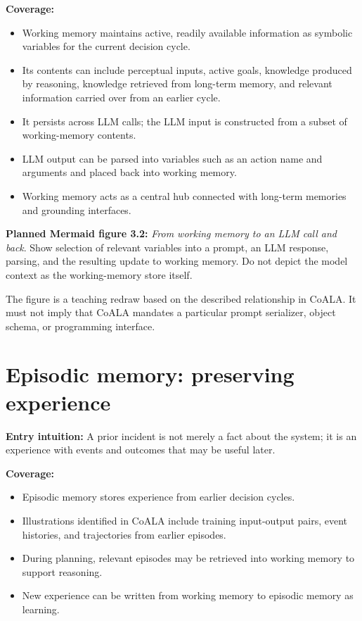 \textbf{Coverage:}
\begin{itemize}
  \item Working memory maintains active, readily available information as symbolic variables for the current decision cycle.
  \item Its contents can include perceptual inputs, active goals, knowledge produced by reasoning, knowledge retrieved from long-term memory, and relevant information carried over from an earlier cycle.
  \item It persists across LLM calls; the LLM input is constructed from a subset of working-memory contents.
  \item LLM output can be parsed into variables such as an action name and arguments and placed back into working memory.
  \item Working memory acts as a central hub connected with long-term memories and grounding interfaces.
\end{itemize}

\textbf{Planned Mermaid figure 3.2:} \emph{From working memory to an LLM call and back}. Show selection of relevant variables into a prompt, an LLM response, parsing, and the resulting update to working memory. Do not depict the model context as the working-memory store itself.

\begin{notebox}
The figure is a teaching redraw based on the described relationship in CoALA. It must not imply that CoALA mandates a particular prompt serializer, object schema, or programming interface.
\end{notebox}

\section{Episodic memory: preserving experience}
\textbf{Entry intuition:} A prior incident is not merely a fact about the system; it is an experience with events and outcomes that may be useful later.

\textbf{Coverage:}
\begin{itemize}
  \item Episodic memory stores experience from earlier decision cycles.
  \item Illustrations identified in CoALA include training input-output pairs, event histories, and trajectories from earlier episodes.
  \item During planning, relevant episodes may be retrieved into working memory to support reasoning.
  \item New experience can be written from working memory to episodic memory as learning.
\end{itemize}


